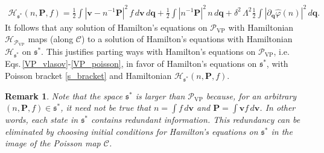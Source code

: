 \documentclass[%
 aip,
 amsmath,amssymb,
reprint, onecolumn %
]{revtex4-1}
\newtheorem{remark}{Remark}
\begin{document}
\begin{align*}
\mathcal{H}_{\mathfrak{s}^*}(n,\bm{P},f) = \frac{1}{2}\int |\bm{v} - n^{-1}\bm{P}|^2\,f\,d\bm{v}\,d\bm{q} + \frac{1}{2}\int|n^{-1}\bm{P}|^2\,n\,d\bm{q} + \delta^2\,\Lambda^2\frac{1}{2}\int |\partial_{\bm{q}}\widehat{\varphi}(n)|^2\,d\bm{q}.
\end{align*}
It follows that any solution of Hamilton's equations on $\mathcal{P}_{\text{VP}}$ with Hamiltonian $\mathcal{H}_{\mathcal{P}_{\text{VP}}}$ maps (along $\mathcal{C}$) to a solution of Hamilton's equations with Hamiltonian $\mathcal{H}_{\mathfrak{s}^*}$ on $\mathfrak{s}^*$. This justifies parting ways with Hamilton's equations on $\mathcal{P}_{\text{VP}}$, i.e. Eqs.\,\eqref{VP_vlasov}-\eqref{VP_poisson}, in favor of Hamilton's equations on $\mathfrak{s}^*$, with Poisson bracket \eqref{s_bracket} and Hamiltonian $\mathcal{H}_{\mathfrak{s}^*}(n,\bm{P},f)$. 
\begin{remark}
Note that the space $\mathfrak{s}^*$ is larger than $\mathcal{P}_{\text{VP}}$ because, for an arbitrary $(n,\bm{P},f)\in\mathfrak{s}^*$, it need not be true that $n = \int f\,d\bm{v}$ and $\bm{P} = \int \bm{v}f\,d\bm{v}$. In other words, each state in $\mathfrak{s}^*$ contains redundant information. This redundancy can be eliminated by choosing initial conditions for Hamilton's equations on $\mathfrak{s}^*$ in the image of the Poisson map $\mathcal{C}$.
\end{remark}
\end{document}
